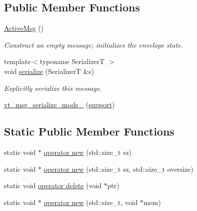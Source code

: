 \subsection*{Public Member Functions}
\begin{DoxyCompactItemize}
\item 
\hyperlink{structvt_1_1messaging_1_1_active_msg_a5fd6a7b78c86b8f1e36198142990a4c4}{Active\+Msg} ()
\begin{DoxyCompactList}\small\item\em Construct an empty message; initializes the envelope state. \end{DoxyCompactList}\item 
{\footnotesize template$<$typename SerializerT $>$ }\\void \hyperlink{structvt_1_1messaging_1_1_active_msg_a758f02bef5991c48d6c9a56c30ca7ad9}{serialize} (SerializerT \&s)
\begin{DoxyCompactList}\small\item\em Explicitly serialize this message. \end{DoxyCompactList}\item 
\hyperlink{structvt_1_1messaging_1_1_active_msg_a97b214f27e477ea5951a2d697f2256e7}{vt\+\_\+msg\+\_\+serialize\+\_\+mode\+\_\+} (\hyperlink{namespacevt_1_1messaging_a436c5b9fc7f591e5978a136999cb9ef8a434990c8a25d2be94863561ae98bd682}{support})
\end{DoxyCompactItemize}
\subsection*{Static Public Member Functions}
\begin{DoxyCompactItemize}
\item 
static void $\ast$ \hyperlink{structvt_1_1messaging_1_1_active_msg_ac79d16742251f19ed94f9725ed866f64}{operator new} (std\+::size\+\_\+t sz)
\item 
static void $\ast$ \hyperlink{structvt_1_1messaging_1_1_active_msg_ac13140f75e5238670c81589a84881ac1}{operator new} (std\+::size\+\_\+t sz, std\+::size\+\_\+t oversize)
\item 
static void \hyperlink{structvt_1_1messaging_1_1_active_msg_a37cd0731f99157266333772f501d390d}{operator delete} (void $\ast$ptr)
\item 
static void $\ast$ \hyperlink{structvt_1_1messaging_1_1_active_msg_a03927a2881ef7e3308765361cb89c606}{operator new} (std\+::size\+\_\+t, void $\ast$mem)
\end{DoxyCompactItemize}
